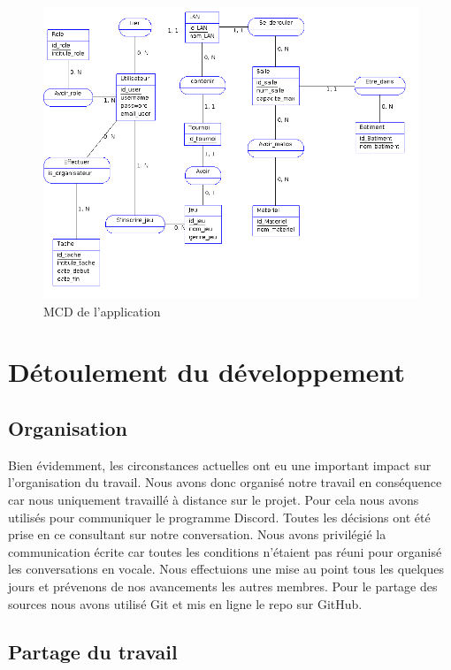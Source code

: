 \documentclass[12pt]{article}
\begin{document}
\begin{figure}[htp]
\centering
\includegraphics[scale=0.50]{images/mcd.png}
\caption{MCD de l'application}
\label{}
\end{figure}

\newpage

\section{Détoulement du développement}

\subsection{Organisation}

Bien évidemment, les circonstances actuelles ont eu une important impact sur l'organisation du travail. Nous avons donc organisé notre travail en conséquence car nous uniquement travaillé à distance sur le projet. Pour cela nous avons utilisés pour communiquer le programme Discord. Toutes les décisions ont été prise en ce consultant sur notre conversation. Nous avons privilégié la communication écrite car toutes les conditions n'étaient pas réuni pour organisé les conversations en vocale. Nous effectuions une mise au point tous les quelques jours et prévenons de nos avancements les autres membres. Pour le partage des sources nous avons utilisé Git et mis en ligne le repo sur GitHub.

\subsection{Partage du travail}
\end{document}
